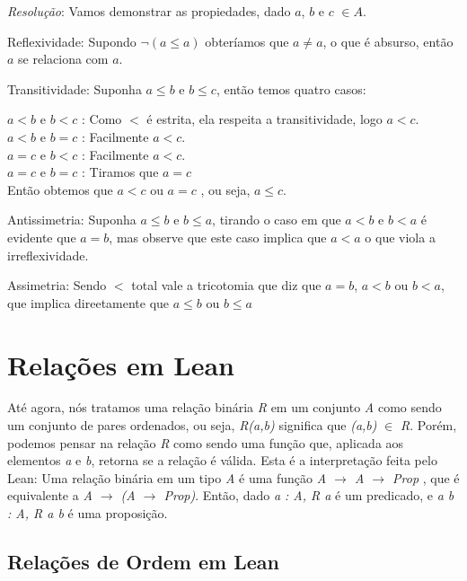 \begin{enumerate}
    \textit{Resolução}: Vamos demonstrar as propiedades, dado $a$, $b$ e $c$ $\in A$.
    
    Reflexividade: Supondo $\neg(a \leq a)$ obteríamos que $a \neq a$, o que é absurso, então $a$ se relaciona com $a$.
    
    Transitividade: Suponha $a \leq b$ e $b \leq c$, então temos quatro casos:
    
    $a<b$ e $b<c$ : Como $<$ é estrita, ela respeita a transitividade, logo $a<c$.\\
    $a<b$ e $b=c$ : Facilmente $a<c$.\\
    $a=c$ e $b<c$ : Facilmente $a<c$.\\
    $a=c$ e $b=c$ : Tiramos que $a=c$\\
    Então obtemos que $a<c$ ou $a=c$ , ou seja, $a \leq c$.
    
    Antissimetria: Suponha $a \leq b$ e $b \leq a$, tirando o caso em que $a<b$ e $b<a$ é evidente que $a=b$, mas observe que este caso implica que $a<a$ o que viola a irreflexividade.
    
    Assimetria: Sendo $<$ total vale a tricotomia que diz que $a=b$, $a<b$ ou $b<a$, que implica direetamente que $a \leq b$ ou  $b \leq a$
    
    
\end{enumerate}

\section{Relações em Lean}
Até agora, nós tratamos uma relação binária \textit{R} em um conjunto \textit{A} como sendo um conjunto de pares ordenados, ou seja, \textit{R(a,b)} significa que \textit{(a,b)} $\in$ \textit{R}.
Porém, podemos pensar na relação \textit{R} como sendo uma função que, aplicada aos elementos \textit{a} e \textit{b}, retorna se a relação é válida.
Esta é a interpretação feita pelo Lean: Uma relação binária em um tipo \textit{A} é uma função \textit{ A $\rightarrow$ A $\rightarrow$ Prop }, que é equivalente a \textit{A $\rightarrow$ (A $\rightarrow$ Prop)}.
Então, dado \textit{a : A, R a} é um predicado, e \textit{a b : A, R a b} é uma proposição.

\subsection{Relações de Ordem em Lean}

